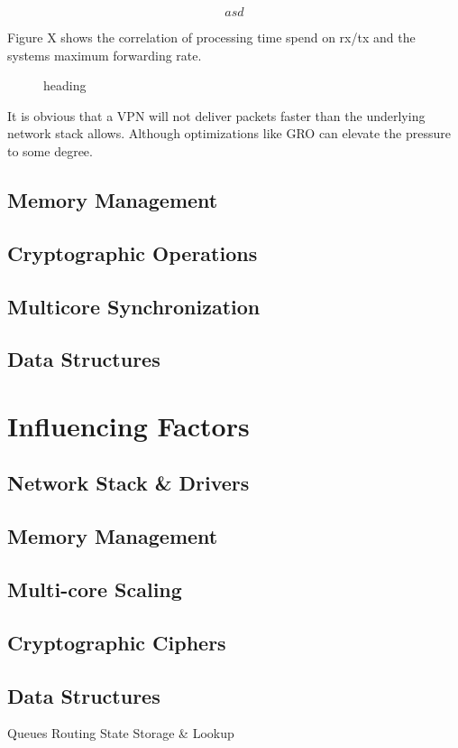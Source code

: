 \begin{equation}\label{eq:cost}
asd
\end{equation}

Figure X shows the correlation of processing time spend on rx/tx and the systems maximum forwarding rate.

\begin{figure}[h]
	\centering
	\caption{heading}
\end{figure}


It is obvious that a VPN will not deliver packets faster than the underlying network stack allows. 
Although optimizations like GRO can elevate the pressure to some degree.

\subsection{Memory Management}
\subsection{Cryptographic Operations}
\subsection{Multicore Synchronization}
\subsection{Data Structures}


\section{Influencing Factors}
	\subsection{Network Stack \& Drivers}
	\subsection{Memory Management}
	\subsection{Multi-core Scaling}
	\subsection{Cryptographic Ciphers}
	\subsection{Data Structures}
		Queues
		Routing
		State Storage \& Lookup
